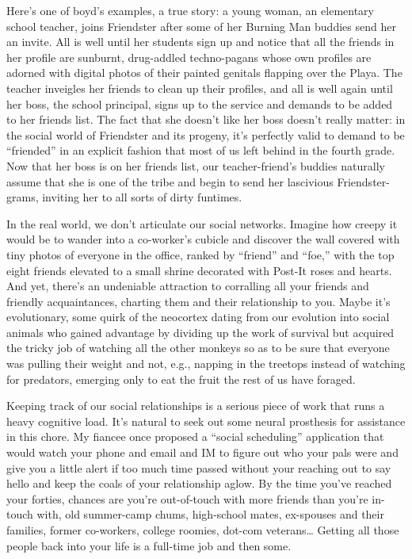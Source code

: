 Here's one of boyd's examples, a true story: a young woman, an
elementary school teacher, joins Friendster after some of her
Burning Man buddies send her an invite. All is well until her
students sign up and notice that all the friends in her profile are
sunburnt, drug-addled techno-pagans whose own profiles are adorned
with digital photos of their painted genitals flapping over the
Playa. The teacher inveigles her friends to clean up their
profiles, and all is well again until her boss, the school
principal, signs up to the service and demands to be added to her
friends list. The fact that she doesn't like her boss doesn't
really matter: in the social world of Friendster and its progeny,
it's perfectly valid to demand to be ``friended'' in an explicit
fashion that most of us left behind in the fourth grade. Now that
her boss is on her friends list, our teacher-friend's buddies
naturally assume that she is one of the tribe and begin to send her
lascivious Friendster-grams, inviting her to all sorts of dirty
funtimes.

In the real world, we don't articulate our social networks. Imagine
how creepy it would be to wander into a co-worker's cubicle and
discover the wall covered with tiny photos of everyone in the
office, ranked by ``friend'' and ``foe,'' with the top eight friends
elevated to a small shrine decorated with Post-It roses and hearts.
And yet, there's an undeniable attraction to corralling all your
friends and friendly acquaintances, charting them and their
relationship to you. Maybe it's evolutionary, some quirk of the
neocortex dating from our evolution into social animals who gained
advantage by dividing up the work of survival but acquired the
tricky job of watching all the other monkeys so as to be sure that
everyone was pulling their weight and not, e.g., napping in the
treetops instead of watching for predators, emerging only to eat
the fruit the rest of us have foraged.

Keeping track of our social relationships is a serious piece of
work that runs a heavy cognitive load. It's natural to seek out
some neural prosthesis for assistance in this chore. My fiancee
once proposed a ``social scheduling'' application that would watch
your phone and email and IM to figure out who your pals were and
give you a little alert if too much time passed without your
reaching out to say hello and keep the coals of your relationship
aglow. By the time you've reached your forties, chances are you're
out-of-touch with more friends than you're in-touch with, old
summer-camp chums, high-school mates, ex-spouses and their
families, former co-workers, college roomies, dot-com veterans\ldots{}
Getting all those people back into your life is a full-time job and
then some.

